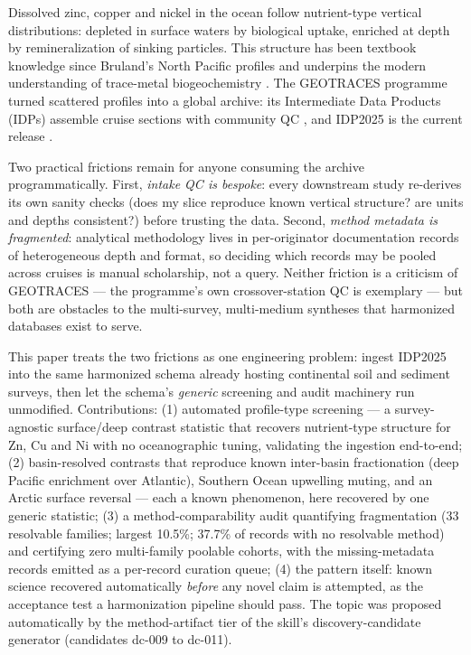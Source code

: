 \documentclass[11pt]{article}
\begin{document}
Dissolved zinc, copper and nickel in the ocean follow nutrient-type
vertical distributions: depleted in surface waters by biological uptake,
enriched at depth by remineralization of sinking particles. This structure
has been textbook knowledge since Bruland's North Pacific profiles
\cite{bruland1980} and underpins the modern understanding of trace-metal
biogeochemistry \cite{morel2003}. The GEOTRACES programme turned scattered
profiles into a global archive: its Intermediate Data Products (IDPs)
assemble cruise sections with community QC \cite{schlitzer2018}, and
IDP2025 is the current release \cite{geotraces2025}.

Two practical frictions remain for anyone consuming the archive
programmatically. First, \emph{intake QC is bespoke}: every downstream
study re-derives its own sanity checks (does my slice reproduce known
vertical structure? are units and depths consistent?) before trusting the
data. Second, \emph{method metadata is fragmented}: analytical methodology
lives in per-originator documentation records of heterogeneous depth and
format, so deciding which records may be pooled across cruises is manual
scholarship, not a query. Neither friction is a criticism of GEOTRACES ---
the programme's own crossover-station QC is exemplary --- but both are
obstacles to the multi-survey, multi-medium syntheses that harmonized
databases exist to serve.

This paper treats the two frictions as one engineering problem: ingest
IDP2025 into the same harmonized schema already hosting continental soil
and sediment surveys, then let the schema's \emph{generic} screening and
audit machinery run unmodified. Contributions:
(1) automated profile-type screening --- a survey-agnostic surface/deep
contrast statistic that recovers nutrient-type structure for Zn, Cu and Ni
with no oceanographic tuning, validating the ingestion end-to-end;
(2) basin-resolved contrasts that reproduce known inter-basin
fractionation (deep Pacific enrichment over Atlantic), Southern Ocean
upwelling muting, and an Arctic surface reversal --- each a known
phenomenon, here recovered by one generic statistic;
(3) a method-comparability audit quantifying fragmentation (33 resolvable
families; largest 10.5\%; 37.7\% of records with no resolvable method) and
certifying zero multi-family poolable cohorts, with the missing-metadata
records emitted as a per-record curation queue;
(4) the pattern itself: known science recovered automatically \emph{before}
any novel claim is attempted, as the acceptance test a harmonization
pipeline should pass. The topic was proposed automatically by the
method-artifact tier of the skill's discovery-candidate generator
(candidates dc-009 to dc-011).
\end{document}
